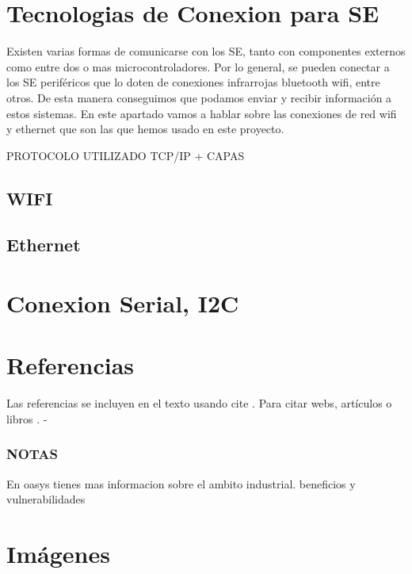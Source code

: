 \section{Tecnologias de Conexion para SE}

Existen varias formas de comunicarse con los SE, tanto con componentes externos como entre dos o mas microcontroladores. Por lo general, se pueden conectar a los SE periféricos que lo doten de conexiones infrarrojas bluetooth wifi, entre otros. De esta manera conseguimos que podamos enviar y recibir información a estos sistemas. En este apartado vamos a hablar sobre las conexiones de red wifi y ethernet que son las que hemos usado en este proyecto.

PROTOCOLO UTILIZADO TCP/IP + CAPAS

\subsection{WIFI}



\subsection{Ethernet}

\section{Conexion Serial, I2C}



\section{Referencias}

Las referencias se incluyen en el texto usando cite \cite{wiki:latex}. Para citar webs, artículos o libros \cite{koza92}.
- 

\subsubsection{NOTAS}

En oasys tienes mas informacion sobre el ambito industrial. beneficios y vulnerabilidades

\section{Imágenes}

